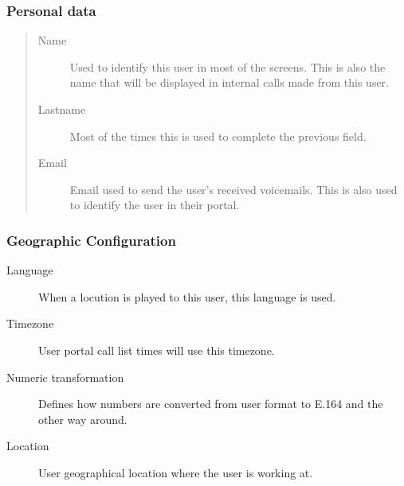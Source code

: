 \documentclass[letterpaper,10pt,spanish]{sphinxmanual}
\begin{document}
\subsubsection{Personal data}
\label{administration_portal/client/vpbx/users:personal-data}\begin{quote}
\begin{description}
\item[{Name}] \leavevmode
Used to identify this user in most of the screens. This is also the
name that will be displayed in internal calls made from this user.

\item[{Lastname}] \leavevmode
Most of the times this is used to complete the previous field.

\item[{Email}] \leavevmode
Email used to send the user's received voicemails. This is also used to
identify the user in their portal.

\end{description}
\end{quote}


\subsubsection{Geographic Configuration}
\label{administration_portal/client/vpbx/users:geographic-configuration}\begin{description}
\item[{Language}] \leavevmode{}\label{administration_portal/client/vpbx/users:term-language}
When a locution is played to this user, this language is used.

\item[{Timezone}] \leavevmode{}\label{administration_portal/client/vpbx/users:term-timezone}
User portal call list times will use this timezone.

\item[{Numeric transformation}] \leavevmode{}\label{administration_portal/client/vpbx/users:term-numeric-transformation}
Defines how numbers are converted from user format to E.164 and
the other way around.

\item[{Location}] \leavevmode{}\label{administration_portal/client/vpbx/users:term-location}
User geographical location where the user is working at.

\end{description}
\end{document}
